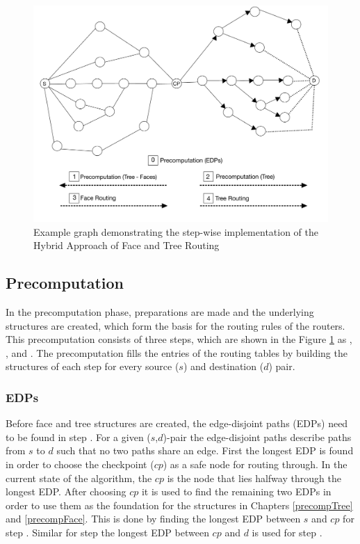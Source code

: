\documentclass[a4paper,UKenglish,cleveref, autoref, thm-restate,dvipsnames]{lipics-v2021}
\begin{document}
\begin{figure}[h]
\centering
\includegraphics[scale=0.4 ]{figures/concept(1).jpeg}
\caption{Example graph demonstrating the step-wise implementation of the Hybrid Approach of Face and Tree Routing}
\label{conceptFigure}
\end{figure}

\subsection{Precomputation}
\label{precomputation}
In the precomputation phase, preparations are made and the underlying structures are created, which form the basis for the routing rules of the routers. This precomputation consists of three steps, which are shown in the Figure \ref{conceptFigure} as , , and . The precomputation fills the entries of the routing tables by building the structures of each step for every source ($s$) and destination ($d$) pair.
\newpage
\subsubsection{EDPs}
Before face and tree structures are created, the edge-disjoint paths (EDPs) need to be found in step .
For a given ($s$,$d$)-pair the edge-disjoint paths describe paths from $s$ to $d$ such that no two paths share an edge.
First the longest EDP is found in order to choose the checkpoint ($cp$) as a safe node for routing through.
In the current state of the algorithm, the $cp$ is the node that lies halfway through the longest EDP.
After choosing $cp$ it is used to find the remaining two EDPs in order to use them as the foundation for the structures in Chapters \ref{precompTree} and \ref{precompFace}.
This is done by finding the longest EDP between $s$ and $cp$ for step .
Similar for step  the longest EDP between $cp$ and $d$ is used for step .
\end{document}
